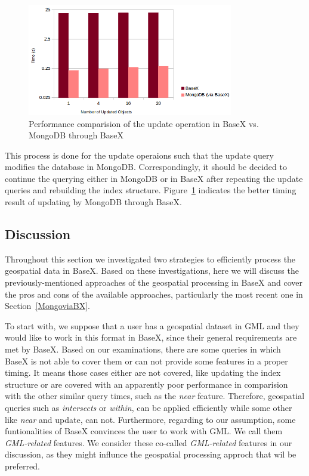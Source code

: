 \documentclass[a4paper,12pt]{article}
\begin{document}
\begin{figure}
\centering
\includegraphics[width=0.8\textwidth]{MongoviaBX-Update-sec-log.png}
\caption{Performance comparision of the update operation in BaseX vs. MongoDB through BaseX}
\label{figMongoviaBX-update}
\end{figure}

This process is done for the update operaions such that the update query modifies the database in MongoDB. Correspondingly, it should be decided to continue the querying either in MongoDB or in BaseX after repeating the update queries and rebuilding the index structure. Figure~\ref{figMongoviaBX-update} indicates the better timing result of updating by MongoDB through BaseX. 

\subsection{Discussion}
\label{s.disc}
Throughout this section we investigated two strategies to efficiently process the geospatial data in BaseX. Based on these investigations, here we will discuss the  previously-mentioned approaches of the geospatial processing in BaseX and cover the pros and cons of the available approaches, particularly the most recent one in Section~\ref{MongoviaBX}. 

To start with, we suppose that a user has a geospatial dataset in GML and they would like to work in this format in BaseX, since their general requirements are met by BaseX. Based on our examinations, there are some queries in which BaseX is not able to cover them or can not provide some features in a proper timing. It means those cases either are not covered, like updating the index structure or are covered with an apparently poor performance in comparision with the other similar query times, such as the \textit{near} feature. Therefore, geospatial queries such as \textit{intersects} or \textit{within}, can be applied efficiently while some other like \textit{near} and update, can not. Furthermore, regarding to our assumption, some funtionalities of BaseX convinces the user to work with GML. We call them \textit{GML-related} features. We consider these co-called \textit{GML-related} features in our discussion, as they might influnce the geospatial processing approch that wil be preferred.
\end{document}
